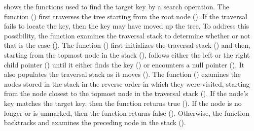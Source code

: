  shows the functions used to find the target key by a search operation. The function \SeekForSearch{} () first traverses the tree starting from the root node (). If the traversal fails to locate the key, then the key may have moved up the tree. To address this possibility, the function examines the traversal stack to determine whether or not that is the case (). The function \TraverseTree{} () first initializes the traversal stack () and then, starting from the topmost node in the stack (), follows either the left or the right child pointer () until it either finds the key () or encounters a null pointer (). It also populates the traversal stack as it moves (). The function \ExamineStack () examines the \myanchor{} nodes stored in the stack in the reverse order in which they were visited, starting from the \myanchor{} node closest to the topmost node in the traversal stack (). If the \myanchor{} node's key matches the target key, then the function returns true (). If the \myanchor{} node is no longer \myconsistent{} or is unmarked, then the function returns false (). Otherwise, the function backtracks and examines the preceding \myanchor{} node in the stack ().

